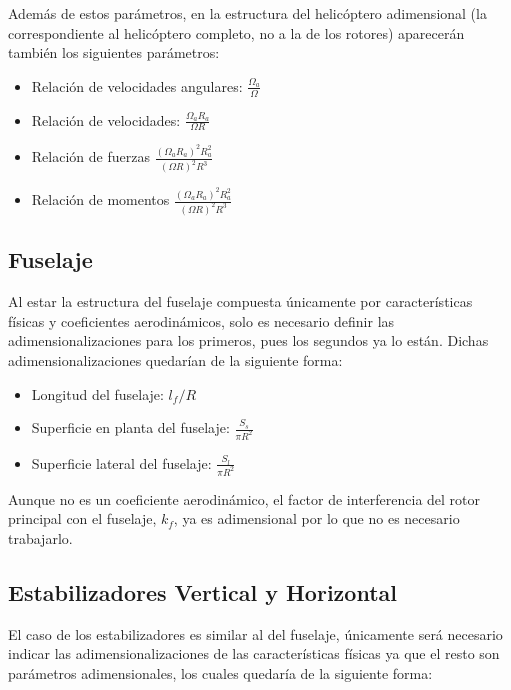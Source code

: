 Además de estos parámetros, en la estructura del helicóptero adimensional (la correspondiente al helicóptero completo, no a la de los rotores) aparecerán también los siguientes parámetros:
\singlespacing
\begin{multicols}{2}
	\begin{itemize}
		\item Relación de velocidades angulares: $\frac{\Omega_a}{\Omega}$
		\item Relación de velocidades: $\frac{\Omega_aR_a}{\Omega R}$
		\item Relación de fuerzas $\frac{(\Omega_aR_a)^2R_a^2}{(\Omega R)^2R^3}$
		\item Relación de momentos $\frac{(\Omega_aR_a)^2R_a^2}{(\Omega R)^2R^3}$
	\end{itemize}
\end{multicols}
\subsection{Fuselaje}

Al estar la estructura del fuselaje compuesta únicamente por características físicas y coeficientes aerodinámicos, solo es necesario definir las adimensionalizaciones para los primeros, pues los segundos ya lo están. Dichas adimensionalizaciones quedarían de la siguiente forma:

\singlespacing
\begin{multicols}{2}
	\begin{itemize}
		\item Longitud del fuselaje: $l_f/R$
		\item Superficie en planta del fuselaje: $\frac{S_s}{\pi R^2}$
		\item Superficie lateral del fuselaje: $\frac{S_l}{\pi R^2}$
	\end{itemize}
\end{multicols}

Aunque no es un coeficiente aerodinámico, el factor de interferencia del rotor principal con el fuselaje, $k_f$, ya es adimensional por lo que no es necesario trabajarlo.

\subsection{Estabilizadores Vertical y Horizontal}

El caso de los estabilizadores es similar al del fuselaje, únicamente será necesario indicar las adimensionalizaciones de las características físicas ya que el resto son parámetros adimensionales, los cuales quedaría de la siguiente forma:

